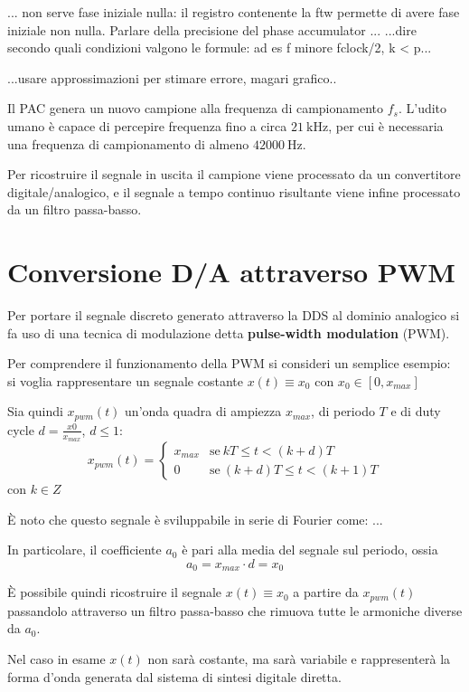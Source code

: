 ... non serve fase iniziale nulla: il registro contenente la ftw permette
di avere fase iniziale non nulla. Parlare della precisione del 
phase accumulator ...
...dire secondo quali condizioni valgono le formule: ad es f minore fclock/2, k < p...

...usare approssimazioni per stimare errore, magari grafico..

Il PAC genera un nuovo campione alla frequenza di campionamento $f_s$.
L'udito umano è capace di percepire frequenza fino a circa $\SI{21}{\kilo\hertz}$, per cui è necessaria una frequenza di campionamento di almeno $\SI{42000}{\hertz}$.

Per ricostruire il segnale in uscita il campione viene processato da un convertitore digitale/analogico, e il segnale a tempo continuo risultante viene infine processato da un filtro passa-basso.

\section{Conversione D/A attraverso PWM}
Per portare il segnale discreto generato attraverso la DDS al dominio analogico si fa uso di una tecnica di modulazione detta \textbf{pulse-width modulation} (PWM).

Per comprendere il funzionamento della PWM si consideri un semplice esempio: si voglia rappresentare un segnale costante $x(t) \equiv x_0$ con $x_0 \in [0, x_{max}]$

Sia quindi $x_{pwm}(t)$ un'onda quadra di ampiezza $x_{max}$, di periodo $T$ e di duty cycle $d=\frac{x0}{x_{max}}$, $d \le 1$:
\[
x_{pwm}(t) = \begin{cases}
	x_{max} & \text{se}\ kT \le t < (k+d)T \\
	0 & \text{se}\ (k+d)T \le t < (k+1)T
\end{cases}
\] 
con $k \in Z$

È noto che questo segnale è sviluppabile in serie di Fourier come: ...

In particolare, il coefficiente $a_0$ è pari alla media del segnale sul periodo, ossia
\[
a_0 = x_{max} \cdot d = x_0
\]

È possibile quindi ricostruire il segnale $x(t)\equiv x_0$ a partire da $x_{pwm}(t)$ passandolo attraverso un filtro passa-basso che rimuova tutte le armoniche diverse da $a_0$.

Nel caso in esame $x(t)$ non sarà costante, ma sarà variabile e rappresenterà la forma d'onda generata dal sistema di sintesi digitale diretta.

